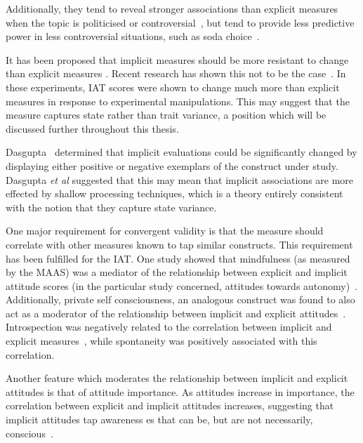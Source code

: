 Additionally, they tend to reveal stronger associations than explicit measures when the topic is politicised or controversial~\cite{Greenwald2009}, but tend to provide less predictive power in less controversial situations, such as soda choice~\cite{Karpinski2006}.


It has been proposed that implicit measures should be more resistant to change than explicit measures \cite{Greenwald1995a,Greenwald1998}. Recent research has shown this not to be the case~\cite{Meagher2004,Gschwendner2008}. In these experiments, IAT scores were shown to change much more than explicit measures in response to experimental manipulations. This may suggest that the measure captures state rather than trait variance, a position which will be discussed further throughout this thesis. 

Dasgupta~\cite{Dasgupta2001} determined that implicit evaluations could be significantly changed by displaying either positive or negative exemplars of the construct under study. Dasgupta \textit{et al} suggested that this may mean that implicit associations are more effected by shallow processing techniques, which is a theory entirely consistent with the notion that they capture state variance. 

One major requirement for convergent validity is that the measure should correlate with other measures known to tap similar constructs. This requirement has been fulfilled for the IAT. One study showed that mindfulness (as measured by the MAAS) was a mediator of the relationship between explicit and implicit attitude scores (in the particular study concerned, attitudes towards autonomy)~\cite{Levesque2007}. Additionally, private self consciousness, an analogous construct was found to also act as a moderator of the relationship between implicit and explicit attitudes~\cite{Gschwendner2006}. Introspection was negatively related to the correlation between implicit and explicit measures~\cite{Hofmann2005}, while spontaneity was positively associated with this correlation. 

Another feature which moderates the relationship between implicit and explicit attitudes is that of attitude importance. As attitudes increase in importance, the correlation between explicit and implicit attitudes increases, suggesting that implicit attitudes tap awareness es that can be, but are not necessarily, conscious~\cite{Karpinski2005}. 


